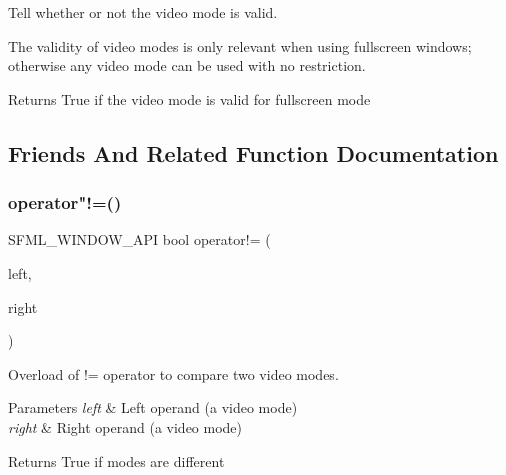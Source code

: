 Tell whether or not the video mode is valid. 

The validity of video modes is only relevant when using fullscreen windows; otherwise any video mode can be used with no restriction.

\begin{DoxyReturn}{Returns}
True if the video mode is valid for fullscreen mode \begin{DoxyVerb}\end{DoxyVerb}
 
\end{DoxyReturn}


\subsection{Friends And Related Function Documentation}
\mbox{\label{classsf_1_1_video_mode_abd7bf172d318085ea572b8c10033f7b7}} 
\subsubsection{\texorpdfstring{operator"!=()}{operator!=()}}
{\footnotesize\ttfamily S\+F\+M\+L\+\_\+\+W\+I\+N\+D\+O\+W\+\_\+\+A\+PI bool operator!= (\begin{DoxyParamCaption}\item[{const \mbox{\hyperlink{classsf_1_1_video_mode}{Video\+Mode}} \&}]{left,  }\item[{const \mbox{\hyperlink{classsf_1_1_video_mode}{Video\+Mode}} \&}]{right }\end{DoxyParamCaption})\hspace{0.3cm}{\ttfamily [related]}}



Overload of != operator to compare two video modes. 


\begin{DoxyParams}{Parameters}
{\em left} & Left operand (a video mode) \\
\hline
{\em right} & Right operand (a video mode)\\
\hline
\end{DoxyParams}
\begin{DoxyReturn}{Returns}
True if modes are different \begin{DoxyVerb}\end{DoxyVerb}
 
\end{DoxyReturn}
\mbox{\label{classsf_1_1_video_mode_a8e3d8fa57fa10dca05edbc34c4e2f1a8}} 
